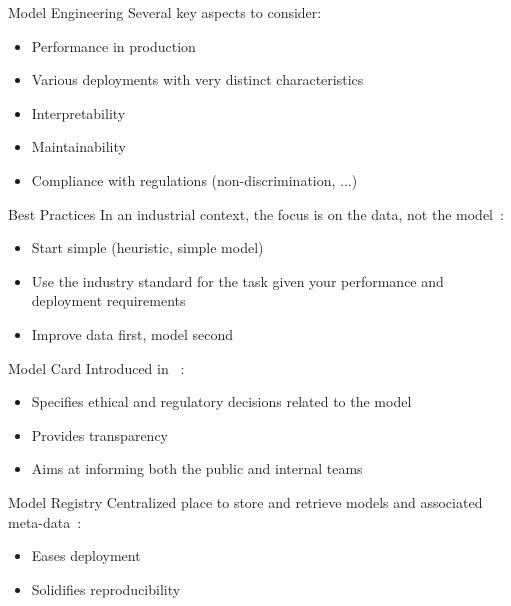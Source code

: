 \begin{frame}{Model Engineering}
  Several key aspects to consider:

  \begin{itemize}
  \item Performance in production
  \item Various deployments with very distinct characteristics
  \item Interpretability
  \item Maintainability
  \item Compliance with regulations (non-discrimination, ...)
  \end{itemize}
\end{frame}

\begin{frame}{Best Practices}
  In an industrial context, the focus is on the data, not the model~:

  \begin{itemize}
    \item Start simple (heuristic, simple model)
    \item Use the industry standard for the task given your performance and deployment requirements
    \item Improve data first, model second
  \end{itemize}
\end{frame}

\begin{frame}{Model Card}
  Introduced in ~:

  \begin{itemize}
    \item Specifies ethical and regulatory decisions related to the model
    \item Provides transparency
    \item Aims at informing both the public and internal teams
  \end{itemize}
\end{frame}

\begin{frame}{Model Registry}
  Centralized place to store and retrieve models and associated meta-data~:

  \begin{itemize}
    \item Eases deployment
    \item Solidifies reproducibility
  \end{itemize}

\end{frame}
